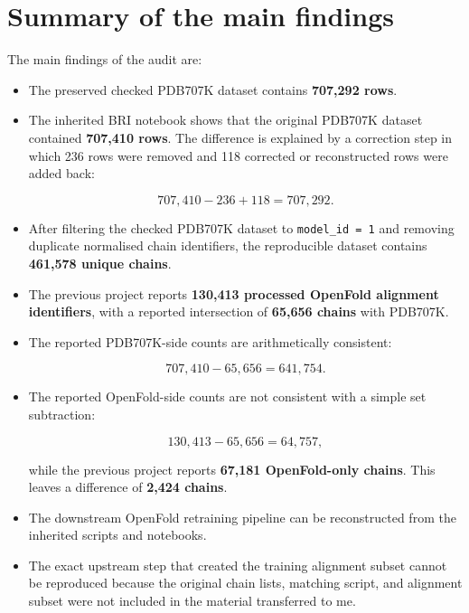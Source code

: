 \documentclass[11pt,a4paper]{article}
\begin{document}
\section{Summary of the main findings}

The main findings of the audit are:

\begin{itemize}[leftmargin=*]

    \item The preserved checked PDB707K dataset contains \textbf{707,292 rows}.

    \item The inherited BRI notebook shows that the original PDB707K dataset contained \textbf{707,410 rows}. The difference is explained by a correction step in which 236 rows were removed and 118 corrected or reconstructed rows were added back:

    \[
        707{,}410 - 236 + 118 = 707{,}292.
    \]

    \item After filtering the checked PDB707K dataset to \texttt{model\_id = 1} and removing duplicate normalised chain identifiers, the reproducible dataset contains \textbf{461,578 unique chains}.

    \item The previous project reports \textbf{130,413 processed OpenFold alignment identifiers}, with a reported intersection of \textbf{65,656 chains} with PDB707K.

    \item The reported PDB707K-side counts are arithmetically consistent:

    \[
        707{,}410 - 65{,}656 = 641{,}754.
    \]

    \item The reported OpenFold-side counts are not consistent with a simple set subtraction:

    \[
        130{,}413 - 65{,}656 = 64{,}757,
    \]

    while the previous project reports \textbf{67,181 OpenFold-only chains}. This leaves a difference of \textbf{2,424 chains}.

    \item The downstream OpenFold retraining pipeline can be reconstructed from the inherited scripts and notebooks.

    \item The exact upstream step that created the training alignment subset cannot be reproduced because the original chain lists, matching script, and alignment subset were not included in the material transferred to me.


\end{itemize}
\end{document}
